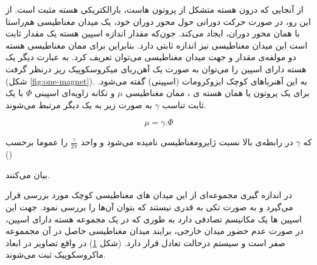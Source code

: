 از آنجایی که درون هسته متشکل از پروتون هاست، بارالکتریکی هسته مثبت است. از این رو، در صورت حرکت دورانی حول محور دوران خود، یک میدان مغناطیسی هم‌راستا با همان محور دوران، ایجاد می‌کند. جون‌که مقدار اندازه اسپین هسته یک مقدار ثابت است این میدان مغناطیسی نیز اندازه ثابتی دارد. بنابراین برای ممان مغناطیسی هسته
دو مولفه‌ی مقدار و جهت میدان مغناطیسی می‌توان تعریف کرد. به عبارت دیگر یک هسته دارای اسپین را می‌توان به صورت یک آهن‌ربای میکروسکوپیک ریز درنظر گرفت
(شکل \ref{fig:one-magnet}).
به این آهنرباهای کوچک ایزوکرومات (اسپینی)
 گفته می‌شود. \cite{SpinEchoMagnetic2013}
برای یک پروتون یا همان هسته ی ، ممان مغناطیسی $\mu$ و تکانه زاویه‌ای اسپینی
$\Phi$
با یک ثابت تناسب $\gamma$ به صورت زیر به یک دیگر مرتبط می‌شوند.

\removevspace
\begin{equation}\label{eq:mu=gamma.phi}
	\mu = \gamma . \Phi
\end{equation}

که $\gamma$ در رابطه‌ی بالا نسبت ژایرومغناطیسی 
نامیده می‌شود و واحد  $\frac{\gamma}{2\pi}$
را عموما برحسب ()

بیان می‌کنند.



\begin{figure}[t]
	\centering
	\caption{}
	\label{fig:balance-spin}
\end{figure}


در اندازه گیری \mr مجموعه‌ای از این میدان های مغناطیسی کوچک مورد بررسی قرار می‌گیرد و به صورت تکی به قدری نیستند که بتوان آن‌ها را بررسی نمود. جهت این اسپین ها یک مکانیسم تصادفی دارد به طوری که در یک مجموعه هسته دارای اسپین، در صورت عدم حضور میدان خارجی، برایند میدان مغناطیسی حاصل در آن مجمموعه صفر است و سیستم درحالت تعادل قرار دارد. 
(شکل \ref{fig:balance-spin}) در واقع تصاویر \mri در ابعاد ماکروسکوپیک ثبت می‌شوند.


